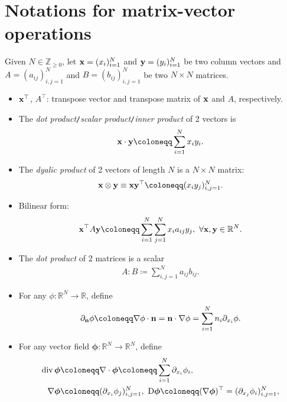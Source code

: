 \documentclass[oneside,11pt]{book}
\numberwithin{equation}{section}
\begin{document}
\section*{Notations for matrix-vector operations}
Given $N\in\mathbb{Z}_{\ge 0}$, let ${\bf x} = (x_i)_{i=1}^N$ and ${\bf y} = (y_i)_{i=1}^N$ be two column vectors and $A = (a_{ij})_{i,j=1}^N$ and $B = (b_{ij})_{i,j=1}^N$ be two $N\times N$ matrices.
\begin{itemize}
    \item ${\bf x}^\top$, $A^\top$: transpose vector and transpose matrix of ${\bf x}$ and $A$, respectively.
    \item The \textit{dot product}\texttt{/}\textit{scalar product}\texttt{/}\textit{inner product} of 2 vectors is
    \begin{align*}
        {\bf x}\cdot{\bf y}\coloneqq\sum_{i=1}^N x_iy_i.
    \end{align*}
    \item The \textit{dyalic product} of 2 vectors of length $N$ is a $N\times N$ matrix:
    \begin{align*}
        {\bf x}\otimes{\bf y}\equiv{\bf x}{\bf y}^\top\coloneqq(x_iy_j)_{i,j=1}^N.
    \end{align*}
    \item Bilinear form:
    \begin{align*}
        {\bf x}^\top A{\bf y}\coloneqq\sum_{i=1}^N\sum_{j=1}^N x_ia_{ij}y_j,\ \forall{\bf x},{\bf y}\in\mathbb{R}^N.
    \end{align*}
    \item The \textit{dot product} of 2 matrices is a scalar
    \begin{align*}
        A:B\coloneqq\sum_{i,j=1}^N a_{ij}b_{ij}.
    \end{align*}
    \item For any $\phi:\mathbb{R}^N\to\mathbb{R}$, define
    \begin{align*}
        \partial_{\bf n}\phi\coloneqq\nabla\phi\cdot{\bf n} = {\bf n}\cdot\nabla\phi = \sum_{i=1}^N n_i\partial_{x_i}\phi.
    \end{align*}
    \item For any vector field $\boldsymbol{\phi}:\mathbb{R}^N\to\mathbb{R}^N$, define
    \begin{align*}
        \operatorname{div}\boldsymbol{\phi}&\coloneqq\nabla\cdot\boldsymbol{\phi}\coloneqq\sum_{i=1}^N \partial_{x_i}\phi_i,\\
        \nabla\boldsymbol{\phi}&\coloneqq(\partial_{x_i}\phi_j)_{i,j=1}^N,\ {\rm D}\boldsymbol{\phi}\coloneqq(\nabla\boldsymbol{\phi})^\top = (\partial_{x_j}\phi_i)_{i,j=1}^N,\\

\end{align*}
\end{itemize}
\end{document}
